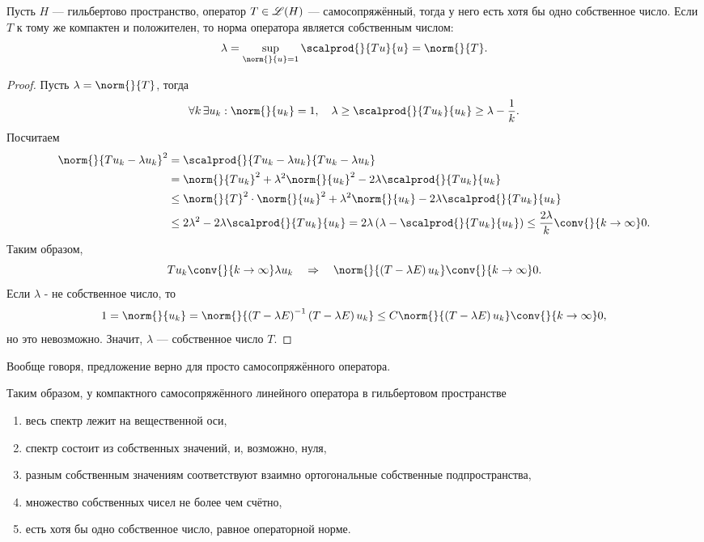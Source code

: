 \begin{prop}
Пусть $H$ --- гильбертово пространство, оператор $T \in \mathscr{L}(H)$ --- самосопряжённый, тогда у него есть хотя бы одно собственное число. Если $T$ к тому же компактен и положителен, то норма оператора является собственным числом:
$$ \lambda = \sup_{\norm{}{u} = 1} \scalprod{}{Tu}{u} = \norm{}{T}.$$
\end{prop}
\begin{proof} Пусть $\lambda = \norm{}{T}$, тогда
$$ \forall k \, \exists u_k : \norm{}{u_k} = 1, \quad \lambda \geq \scalprod{}{Tu_k}{u_k} \geq \lambda - \frac {1} {k}.$$
Посчитаем
\begin{align*}
\norm{}{T u_k - \lambda u_k}^2 &= \scalprod{}{Tu_k - \lambda u_k}{Tu_k - \lambda u_k} \\
& = \norm{}{Tu_k}^2 + \lambda^2 \norm{}{u_k}^2 - 2 \lambda \scalprod{}{Tu_k}{u_k} \\
&\leq \norm{}{T}^2 \cdot \norm{}{u_k}^2 + \lambda^2 \norm{}{u_k} - 2 \lambda \scalprod{}{Tu_k}{u_k} \\
&\leq 2 \lambda^2 - 2 \lambda \scalprod{}{Tu_k}{u_k} = 2\lambda \left( \lambda - \scalprod{}{Tu_k}{u_k} \right) \leq \frac {2\lambda}{k} \conv{}{k \to \infty} 0.
\end{align*}
Таким образом,
$$ T u_k \conv{}{k \to \infty} \lambda u_k \quad \Rightarrow \quad \norm{}{\left( T - \lambda E \right) u_k} \conv{}{k \to \infty} 0.$$
Если $\lambda$ - не собственное число, то
$$ 1 = \norm{}{u_k} = \norm{}{\left( T - \lambda E\right)^{-1} \left( T - \lambda E \right) u_k } \leq C \norm{}{\left( T - \lambda E \right) u_k} \conv{}{k \to \infty} 0,$$
но это невозможно. Значит, $\lambda$ --- собственное число $T$.

\end{proof} %
\begin{note}
Вообще говоря, предложение верно для просто самосопряжённого оператора.
\end{note}

Таким образом, у компактного самосопряжённого линейного оператора в гильбертовом пространстве
\begin{enumerate}
\item весь спектр лежит на вещественной оси,
\item спектр состоит из собственных значений, и, возможно, нуля,
\item разным собственным значениям соответствуют взаимно ортогональные собственные подпространства,
\item множество собственных чисел не более чем счётно,
\item есть хотя бы одно собственное число, равное операторной норме.
\end{enumerate}

